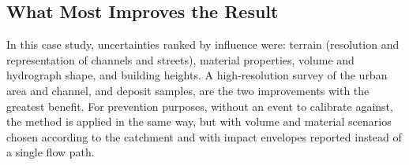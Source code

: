 \subsection*{What Most Improves the Result}
In this case study, uncertainties ranked by influence were: terrain (resolution and representation of channels and streets), material properties, volume and hydrograph shape, and building heights. A high-resolution survey of the urban area and channel, and deposit samples, are the two improvements with the greatest benefit. For prevention purposes, without an event to calibrate against, the method is applied in the same way, but with volume and material scenarios chosen according to the catchment and with impact envelopes reported instead of a single flow path.
